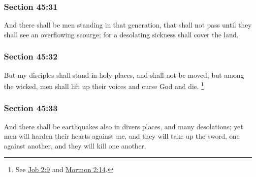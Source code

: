 	\subsubsection{Section 45:31} %
		\label{DC45-31}

		And there shall be men standing in that generation, that shall not pass until they shall see an overflowing scourge; for a desolating sickness shall cover the land.


	\subsubsection{Section 45:32} %
		\label{DC45-32}

		But my disciples shall stand in holy places, and shall not be moved; but among the wicked, men shall lift up their voices and curse God and die.%
			\footnote{%
				See \hyperref[JOB-2-9]{Job 2:9} and \hyperref[MORMON-2-14]{Mormon 2:14}.
				}


	\subsubsection{Section 45:33} %
		\label{DC45-33}

		And there shall be earthquakes also in divers places, and many desolations; yet men will harden their hearts against me, and they will take up the sword, one against another, and they will kill one another.


